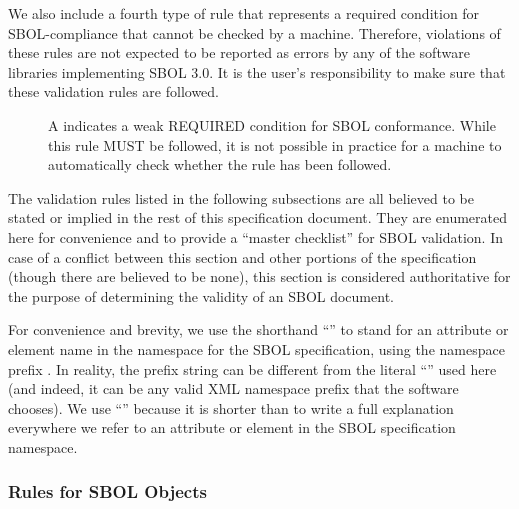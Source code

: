 We also include a fourth type of rule that represents a required condition for SBOL-compliance that cannot be checked by a machine. Therefore, violations of these rules are not expected to be reported as errors by any of the software libraries implementing SBOL 3.0. It is the user's responsibility to make sure that these validation rules are followed.

\begin{description}
\item[\hspace*{6.5pt}\cSymbol\csp] A \cSymbolName indicates a weak REQUIRED condition for SBOL conformance. While this rule MUST be followed, it is not possible in practice for a machine to automatically check whether the rule has been followed.
\end{description}


The validation rules listed in the following subsections are all believed to be
stated or implied in the rest of this specification document.  They
are enumerated here for convenience and to provide a ``master
checklist'' for SBOL validation.  In case of a conflict between this
section and other portions of the specification (though there are believed to
be none), this section is considered authoritative for the purpose of
determining the validity of an SBOL document.

For \notice convenience and brevity, we use the shorthand
``'' to stand for an attribute or element name 
in the namespace for the SBOL specification, using
the namespace prefix .  In reality, the prefix string can be different from the literal ``'' used here (and indeed, it can be any valid XML namespace prefix that the software
chooses).  We use ``'' because it is shorter than to
write a full explanation everywhere we refer to an attribute or element
in the SBOL specification namespace.

\subsubsection*{Rules for SBOL Objects}
\setcounter{sbolCtr}{10101} 


